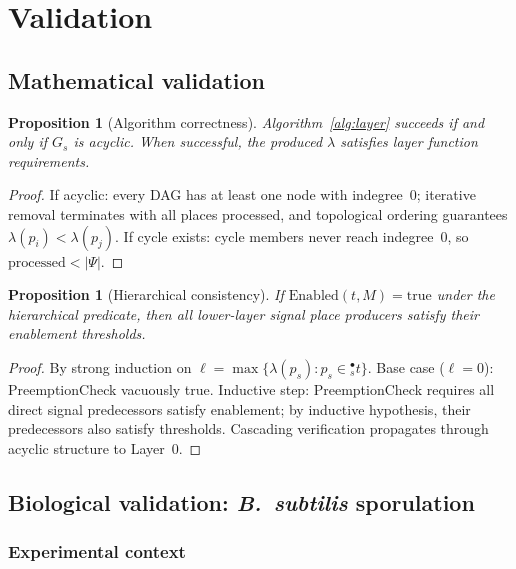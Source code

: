 \documentclass[11pt,a4paper]{article}
\theoremstyle{plain}
\newtheorem{proposition}[theorem]{Proposition}
\theoremstyle{definition}
\begin{document}
\section{Validation}

\subsection{Mathematical validation}

\begin{proposition}[Algorithm correctness]
Algorithm~\ref{alg:layer} succeeds if and only if $G_s$ is acyclic. When successful, the produced $\lambda$ satisfies layer function requirements.
\end{proposition}

\begin{proof}
If acyclic: every DAG has at least one node with indegree~0; iterative removal terminates with all places processed, and topological ordering guarantees $\lambda(p_i) < \lambda(p_j)$. If cycle exists: cycle members never reach indegree~0, so $\mathrm{processed} < |\Psi|$.
\end{proof}

\begin{proposition}[Hierarchical consistency]
If $\mathrm{Enabled}(t, M) = \mathrm{true}$ under the hierarchical predicate, then all lower-layer signal place producers satisfy their enablement thresholds.
\end{proposition}

\begin{proof}
By strong induction on $\ell = \max\{\lambda(p_s) : p_s \in {}^\bullet_s t\}$. Base case ($\ell = 0$): PreemptionCheck vacuously true. Inductive step: PreemptionCheck requires all direct signal predecessors satisfy enablement; by inductive hypothesis, their predecessors also satisfy thresholds. Cascading verification propagates through acyclic structure to Layer~0.
\end{proof}

\subsection{Biological validation: \textit{B.~subtilis} sporulation}

\subsubsection{Experimental context}
\end{document}
